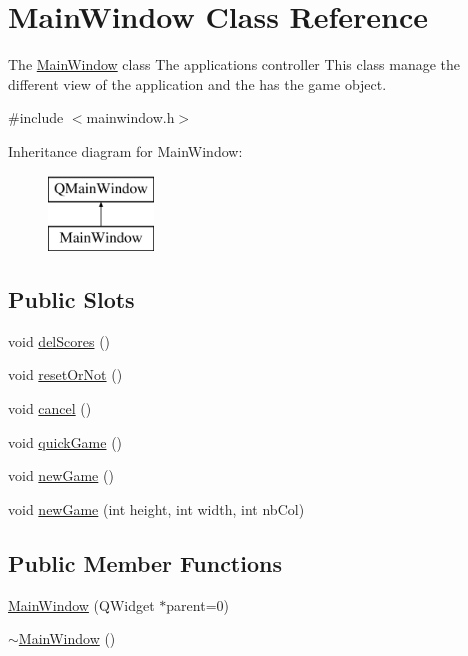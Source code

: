 \hypertarget{class_main_window}{}\section{Main\+Window Class Reference}
\label{class_main_window}


The \hyperlink{class_main_window}{Main\+Window} class The application\textquotesingle{}s controller This class manage the different view of the application and the has the game object.  




{\ttfamily \#include $<$mainwindow.\+h$>$}

Inheritance diagram for Main\+Window\+:\begin{figure}[H]
\begin{center}
\leavevmode
\includegraphics[height=2.000000cm]{class_main_window}
\end{center}
\end{figure}
\subsection*{Public Slots}
\begin{DoxyCompactItemize}
\item 
void \hyperlink{class_main_window_aa760493201dbba331f4447e7b9d7b766}{del\+Scores} ()
\item 
void \hyperlink{class_main_window_a114eef08f156b273538f61c85a3db72f}{reset\+Or\+Not} ()
\item 
void \hyperlink{class_main_window_a04ae3dc178f46ea61ece2b9b209317b8}{cancel} ()
\item 
void \hyperlink{class_main_window_ab1584e555ed5ad91453f18ea51d0351e}{quick\+Game} ()
\item 
void \hyperlink{class_main_window_a36838285112f056c6e8135573918f224}{new\+Game} ()
\item 
void \hyperlink{class_main_window_ae0366468fcf40ee5e65a5239ab530e96}{new\+Game} (int height, int width, int nb\+Col)
\end{DoxyCompactItemize}
\subsection*{Public Member Functions}
\begin{DoxyCompactItemize}
\item 
\hyperlink{class_main_window_a8b244be8b7b7db1b08de2a2acb9409db}{Main\+Window} (Q\+Widget $\ast$parent=0)
\item 
\hyperlink{class_main_window_ae98d00a93bc118200eeef9f9bba1dba7}{$\sim$\+Main\+Window} ()
\end{DoxyCompactItemize}


